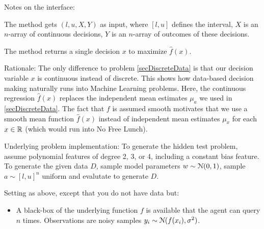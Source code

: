 Notes on the interface:
\begin{items}
\item The method gets $(l,u,X,Y)$ as input, where $[l,u]$ defines the interval, $X$ is an $n$-array of continuous decisions, $Y$ is an $n$-array of outcomes of these decisions.
\item The method returns a single decision $x$ to maximize $\hat f(x)$.
\end{items}

Rationale: The only difference to problem \ref{secDiscreteData} is that our decision variable $x$ is continuous instead of discrete. This shows how data-based decision making naturally runs into Machine Learning problems. Here, the continuous regression $\hat f(x)$ replaces the independent mean estimates $\mu_a$ we used in \ref{secDiscreteData}. The fact that $f$ is assumed smooth motivates that we use a smooth mean function $\hat f(x)$ instead of independent mean estimates $\mu_x$ for each $x\in{\mathbb{R}}$ (which would run into No Free Lunch).

Underlying problem implementation: To generate the hidden test
problem, assume polynomial features of degree 2, 3, or 4, including a
constant bias feature.  To generate the given data $D$, sample model
parameters $w\sim{\cal N}(0,1)$, sample $a\sim[l,u]^n$ uniform and
evalutate to generate $D$.



Setting as above, except that you do not have data but:
\begin{itemize}
\item A black-box of the underlying function $f$ is available that the agent can query $n$ times. Observations are noisy samples $y_i \sim {\cal N}(f(x_i), \sigma^2)$.
\end{itemize}

